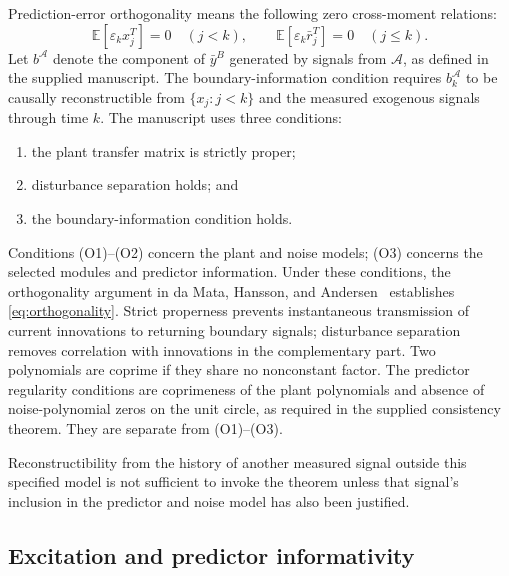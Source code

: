 \documentclass[11pt,a4paper]{article}
\newcommand{\Aset}{\mathcal A}
\begin{document}
Prediction-error orthogonality means the following zero cross-moment relations:
\begin{equation}
  \mathbb E[\varepsilon_kx_j^T]=0\quad(j<k),
  \qquad
  \mathbb E[\varepsilon_k\bar r_j^T]=0\quad(j\leq k).
  \label{eq:orthogonality}
\end{equation}
Let $b^{\Aset}$ denote the component of $\bar y^B$ generated by signals from $\Aset$, as defined in the supplied manuscript.  The boundary-information condition requires $b^{\Aset}_k$ to be causally reconstructible from $\{x_j:j<k\}$ and the measured exogenous signals through time $k$.  The manuscript uses three conditions:
\begin{enumerate}
  \item[(O1)] the plant transfer matrix is strictly proper;
  \item[(O2)] disturbance separation holds; and
  \item[(O3)] the boundary-information condition holds.
\end{enumerate}
Conditions (O1)--(O2) concern the plant and noise models; (O3) concerns the selected modules and predictor information.  Under these conditions, the orthogonality argument in da Mata, Hansson, and Andersen~\cite{DaMataHanssonAndersenSubnetwork} establishes \eqref{eq:orthogonality}.  Strict properness prevents instantaneous transmission of current innovations to returning boundary signals; disturbance separation removes correlation with innovations in the complementary part.
Two polynomials are coprime if they share no nonconstant factor.  The predictor regularity conditions are coprimeness of the plant polynomials and absence of noise-polynomial zeros on the unit circle, as required in the supplied consistency theorem.  They are separate from (O1)--(O3).

Reconstructibility from the history of another measured signal outside this specified model is not sufficient to invoke the theorem unless that signal's inclusion in the predictor and noise model has also been justified.

\subsection{Excitation and predictor informativity}
\label{sec:excitation-definitions}
\end{document}
